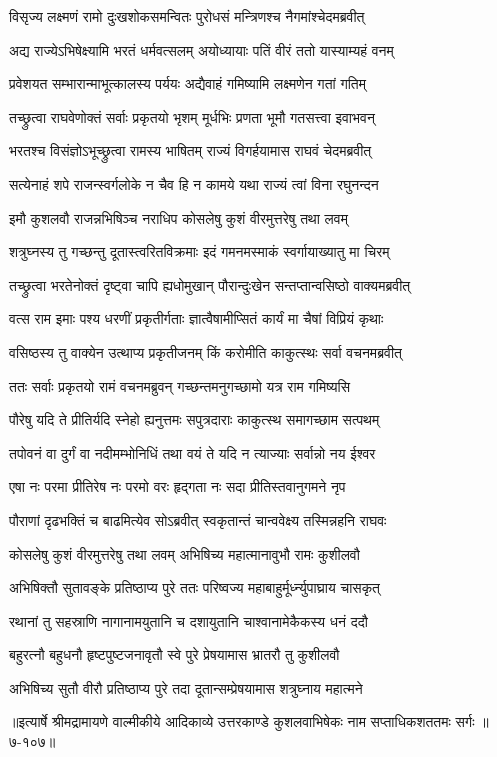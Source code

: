
\twolineshloka
{विसृज्य लक्ष्मणं रामो दुःखशोकसमन्वितः}
{पुरोधसं मन्त्रिणश्च नैगमांश्चेदमब्रवीत्} %

\twolineshloka
{अद्य राज्येऽभिषेक्ष्यामि भरतं धर्मवत्सलम्}
{अयोध्यायाः पतिं वीरं ततो यास्याम्यहं वनम्} %

\twolineshloka
{प्रवेशयत सम्भारान्माभूत्कालस्य पर्ययः}
{अद्यैवाहं गमिष्यामि लक्ष्मणेन गतां गतिम्} %

\twolineshloka
{तच्छ्रुत्वा राघवेणोक्तं सर्वाः प्रकृतयो भृशम्}
{मूर्धभिः प्रणता भूमौ गतसत्त्वा इवाभवन्} %

\twolineshloka
{भरतश्च विसंज्ञोऽभूच्छ्रुत्वा रामस्य भाषितम्}
{राज्यं विगर्हयामास राघवं चेदमब्रवीत्} %

\twolineshloka
{सत्येनाहं शपे राजन्स्वर्गलोके न चैव हि}
{न कामये यथा राज्यं त्वां विना रघुनन्दन} %

\twolineshloka
{इमौ कुशलवौ राजन्नभिषिञ्च नराधिप}
{कोसलेषु कुशं वीरमुत्तरेषु तथा लवम्} %

\twolineshloka
{शत्रुघ्नस्य तु गच्छन्तु दूतास्त्वरितविक्रमाः}
{इदं गमनमस्माकं स्वर्गायाख्यातु मा चिरम्} %

\twolineshloka
{तच्छ्रुत्वा भरतेनोक्तं दृष्ट्वा चापि ह्यधोमुखान्}
{पौरान्दुःखेन सन्तप्तान्वसिष्ठो वाक्यमब्रवीत्} %

\twolineshloka
{वत्स राम इमाः पश्य धरणीं प्रकृतीर्गताः}
{ज्ञात्वैषामीप्सितं कार्यं मा चैषां विप्रियं कृथाः} %

\twolineshloka
{वसिष्ठस्य तु वाक्येन उत्थाप्य प्रकृतीजनम्}
{किं करोमीति काकुत्स्थः सर्वा वचनमब्रवीत्} %

\twolineshloka
{ततः सर्वाः प्रकृतयो रामं वचनमब्रुवन्}
{गच्छन्तमनुगच्छामो यत्र राम गमिष्यसि} %

\twolineshloka
{पौरेषु यदि ते प्रीतिर्यदि स्नेहो ह्यनुत्तमः}
{सपुत्रदाराः काकुत्स्थ समागच्छाम सत्पथम्} %

\twolineshloka
{तपोवनं वा दुर्गं वा नदीमम्भोनिधिं तथा}
{वयं ते यदि न त्याज्याः सर्वान्नो नय ईश्वर} %

\twolineshloka
{एषा नः परमा प्रीतिरेष नः परमो वरः}
{हृद्गता नः सदा प्रीतिस्तवानुगमने नृप} %

\twolineshloka
{पौराणां दृढभक्तिं च बाढमित्येव सोऽब्रवीत्}
{स्वकृतान्तं चान्ववेक्ष्य तस्मिन्नहनि राघवः} %

\twolineshloka
{कोसलेषु कुशं वीरमुत्तरेषु तथा लवम्}
{अभिषिच्य महात्मानावुभौ रामः कुशीलवौ} %

\twolineshloka
{अभिषिक्तौ सुतावङ्के प्रतिष्ठाप्य पुरे ततः}
{परिष्वज्य महाबाहुर्मूर्ध्न्युपाघ्राय चासकृत्} %

\twolineshloka
{रथानां तु सहस्राणि नागानामयुतानि च}
{दशायुतानि चाश्वानामेकैकस्य धनं ददौ} %

\twolineshloka
{बहुरत्नौ बहुधनौ हृष्टपुष्टजनावृतौ}
{स्वे पुरे प्रेषयामास भ्रातरौ तु कुशीलवौ} %

\twolineshloka
{अभिषिच्य सुतौ वीरौ प्रतिष्ठाप्य पुरे तदा}
{दूतान्सम्प्रेषयामास शत्रुघ्नाय महात्मने} %


॥इत्यार्षे श्रीमद्रामायणे वाल्मीकीये आदिकाव्ये उत्तरकाण्डे कुशलवाभिषेकः नाम सप्ताधिकशततमः सर्गः ॥७-१०७॥
